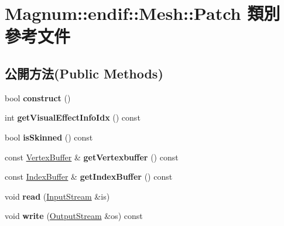 \hypertarget{class_magnum_1_1endif_1_1_mesh_1_1_patch}{}\section{Magnum\+:\+:endif\+:\+:Mesh\+:\+:Patch 類別 參考文件}
\label{class_magnum_1_1endif_1_1_mesh_1_1_patch}
\subsection*{公開方法(Public Methods)}
\begin{DoxyCompactItemize}
\item 
bool {\bfseries construct} ()\hypertarget{class_magnum_1_1endif_1_1_mesh_1_1_patch_a8d81ae716a164d8b5b9b4cacc3eb6198}{}\label{class_magnum_1_1endif_1_1_mesh_1_1_patch_a8d81ae716a164d8b5b9b4cacc3eb6198}

\item 
int {\bfseries get\+Visual\+Effect\+Info\+Idx} () const \hypertarget{class_magnum_1_1endif_1_1_mesh_1_1_patch_aa31179375f6f037929f71d09a44c0c9e}{}\label{class_magnum_1_1endif_1_1_mesh_1_1_patch_aa31179375f6f037929f71d09a44c0c9e}

\item 
bool {\bfseries is\+Skinned} () const \hypertarget{class_magnum_1_1endif_1_1_mesh_1_1_patch_a5e26ca15190b33eacbef59a8188e81f2}{}\label{class_magnum_1_1endif_1_1_mesh_1_1_patch_a5e26ca15190b33eacbef59a8188e81f2}

\item 
const \hyperlink{class_magnum_1_1endif_1_1_vertex_buffer}{Vertex\+Buffer} \& {\bfseries get\+Vertexbuffer} () const \hypertarget{class_magnum_1_1endif_1_1_mesh_1_1_patch_ae97e03352cc817c786d84f5f0470cbcd}{}\label{class_magnum_1_1endif_1_1_mesh_1_1_patch_ae97e03352cc817c786d84f5f0470cbcd}

\item 
const \hyperlink{class_magnum_1_1endif_1_1_index_buffer}{Index\+Buffer} \& {\bfseries get\+Index\+Buffer} () const \hypertarget{class_magnum_1_1endif_1_1_mesh_1_1_patch_a12f15ec576f250ad8948c5cca3abd925}{}\label{class_magnum_1_1endif_1_1_mesh_1_1_patch_a12f15ec576f250ad8948c5cca3abd925}

\item 
void {\bfseries read} (\hyperlink{class_magnum_1_1_input_stream}{Input\+Stream} \&is)\hypertarget{class_magnum_1_1endif_1_1_mesh_1_1_patch_a1e13293cd27b029004ddfb55ee5b23be}{}\label{class_magnum_1_1endif_1_1_mesh_1_1_patch_a1e13293cd27b029004ddfb55ee5b23be}

\item 
void {\bfseries write} (\hyperlink{class_magnum_1_1_output_stream}{Output\+Stream} \&os) const \hypertarget{class_magnum_1_1endif_1_1_mesh_1_1_patch_a4f55d88b2d349b75cf23eed025871ed0}{}\label{class_magnum_1_1endif_1_1_mesh_1_1_patch_a4f55d88b2d349b75cf23eed025871ed0}

\end{DoxyCompactItemize}
